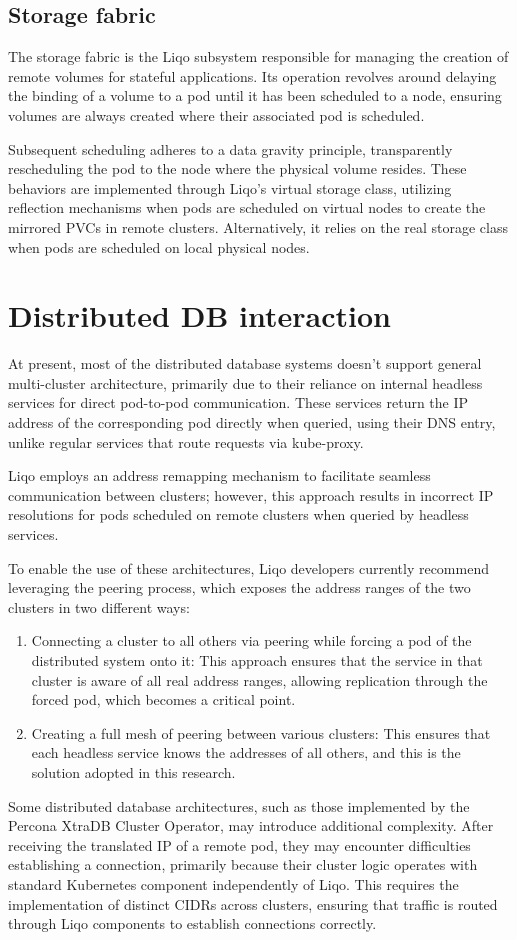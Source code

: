 \subsection{Storage fabric}
The storage fabric is the Liqo subsystem responsible for managing the creation of remote volumes for stateful applications. Its operation revolves around delaying the binding of a volume to a pod until it has been scheduled to a node, ensuring volumes are always created where their associated pod is scheduled. 

Subsequent scheduling adheres to a data gravity principle, transparently rescheduling the pod to the node where the physical volume resides. These behaviors are implemented through Liqo's virtual storage class, utilizing reflection mechanisms when pods are scheduled on virtual nodes to create the mirrored PVCs in remote clusters. Alternatively, it relies on the real storage class when pods are scheduled on local physical nodes.

\section{Distributed DB interaction}
At present, most of the distributed database systems doesn't support general multi-cluster architecture, primarily due to their reliance on internal headless services for direct pod-to-pod communication. These services return the IP address of the corresponding pod directly when queried, using their DNS entry, unlike regular services that route requests via kube-proxy. 

Liqo employs an address remapping mechanism to facilitate seamless communication between clusters; however, this approach results in incorrect IP resolutions for pods scheduled on remote clusters when queried by headless services.

To enable the use of these architectures, Liqo developers currently recommend\cite{l2-1} leveraging the peering process, which exposes the address ranges of the two clusters in two different ways:
\begin{enumerate}
\item Connecting a cluster to all others via peering while forcing a pod of the distributed system onto it: This approach ensures that the service in that cluster is aware of all real address ranges, allowing replication through the forced pod, which becomes a critical point.
\item Creating a full mesh of peering between various clusters: This ensures that each headless service knows the addresses of all others, and this is the solution adopted in this research.
\end{enumerate}
Some distributed database architectures, such as those implemented by the Percona XtraDB Cluster Operator, may introduce additional complexity. After receiving the translated IP of a remote pod, they may encounter difficulties establishing a connection, primarily because their cluster logic operates with standard Kubernetes component independently of Liqo. This requires the implementation of distinct CIDRs across clusters, ensuring that traffic is routed through Liqo components to establish connections correctly.